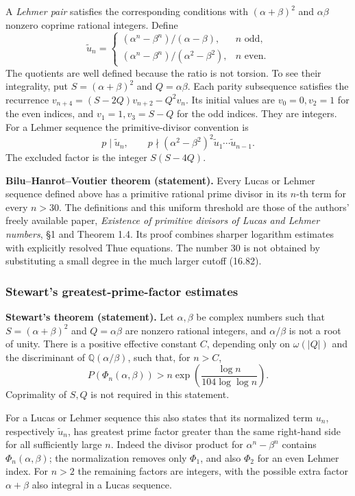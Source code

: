 \documentclass[
  11pt,
  a4paper,
]{article}
\begin{document}
A \emph{Lehmer pair} satisfies the corresponding conditions with
\((\alpha+\beta)^2\) and \(\alpha\beta\) nonzero coprime rational
integers. Define \[
 \widetilde u_n=
 \begin{cases}
 (\alpha^n-\beta^n)/(\alpha-\beta),&n\text{ odd},\\
 (\alpha^n-\beta^n)/(\alpha^2-\beta^2),&n\text{ even}.
 \end{cases}
 \tag{16.103}
\] The quotients are well defined because the ratio is not torsion. To
see their integrality, put \(S=(\alpha+\beta)^2\) and \(Q=\alpha\beta\).
Each parity subsequence satisfies the recurrence
\(v_{n+4}=(S-2Q)v_{n+2}-Q^2v_n\). Its initial values are \(v_0=0,v_2=1\)
for the even indices, and \(v_1=1,v_3=S-Q\) for the odd indices. They
are integers. For a Lehmer sequence the primitive-divisor convention is
\[
 p\mid\widetilde u_n,\qquad
 p\nmid(\alpha^2-\beta^2)^2
            \widetilde u_1\cdots\widetilde u_{n-1}.
 \tag{16.104}
\] The excluded factor is the integer \(S(S-4Q)\).

\textbf{Bilu--Hanrot--Voutier theorem (statement).} Every Lucas or
Lehmer sequence defined above has a primitive rational prime divisor in
its \(n\)-th term for every \(n>30\). The definitions and this uniform
threshold are those of the authors' freely available paper,
\emph{Existence of primitive divisors of Lucas and Lehmer numbers}, §1
and Theorem 1.4. Its proof combines sharper logarithm estimates with
explicitly resolved Thue equations. The number \(30\) is not obtained by
substituting a small degree in the much larger cutoff (16.82).

\subsubsection{Stewart's greatest-prime-factor
estimates}\label{stewarts-greatest-prime-factor-estimates}

\textbf{Stewart's theorem (statement).} Let \(\alpha,\beta\) be complex
numbers such that \(S=(\alpha+\beta)^2\) and \(Q=\alpha\beta\) are
nonzero rational integers, and \(\alpha/\beta\) is not a root of unity.
There is a positive effective constant \(C\), depending only on
\(\omega(|Q|)\) and the discriminant of \(\mathbb Q(\alpha/\beta)\),
such that, for \(n>C\), \[
 P(\Phi_n(\alpha,\beta))>
 n\exp\!\left(\frac{\log n}{104\log\log n}\right).
 \tag{16.105}
\] Coprimality of \(S,Q\) is not required in this statement.

For a Lucas or Lehmer sequence this also states that its normalized term
\(u_n\), respectively \(\widetilde u_n\), has greatest prime factor
greater than the same right-hand side for all sufficiently large \(n\).
Indeed the divisor product for \(\alpha^n-\beta^n\) contains
\(\Phi_n(\alpha,\beta)\); the normalization removes only \(\Phi_1\), and
also \(\Phi_2\) for an even Lehmer index. For \(n>2\) the remaining
factors are integers, with the possible extra factor \(\alpha+\beta\)
also integral in a Lucas sequence.
\end{document}
